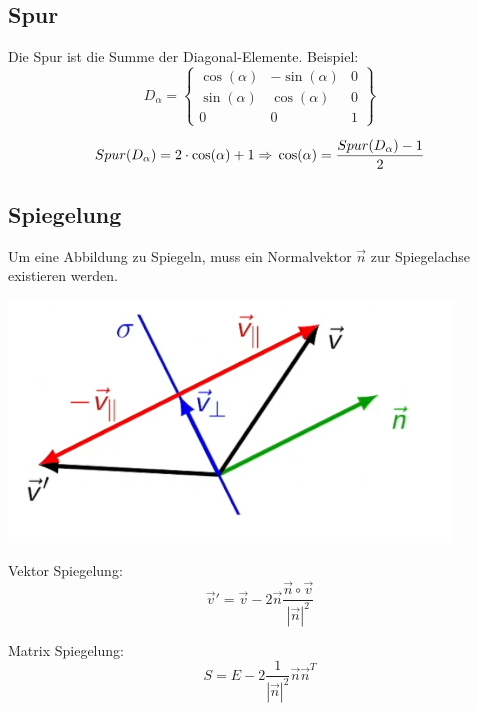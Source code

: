 \subsection{Spur}\label{drehwinkel}
Die Spur ist die Summe der Diagonal-Elemente.
Beispiel:
\[
	D_\alpha = \begin{Bmatrix}
		\cos(\alpha) & -\sin(\alpha) & 0 \\
		\sin(\alpha) & \cos(\alpha) & 0 \\
		0 & 0 & 1
	\end{Bmatrix}
\]

\[
    Spur(D_\alpha) = 2 \cdot \cos(\alpha) + 1 \\
	\Rightarrow \\
	\cos(\alpha) = \frac{Spur(D_\alpha) - 1}{2}
\]

\subsection{Spiegelung}
Um eine Abbildung zu Spiegeln, muss ein Normalvektor $\vec{n}$ zur Spiegelachse existieren werden.

\begin{center}
	\begin{minipage}{0.25\textwidth}
		\includegraphics[width=\linewidth,keepaspectratio=true]{./Images/Spiegelung.png}
	\end{minipage}%
	\begin{minipage}{0.2\textwidth}
		Vektor Spiegelung:
		\[\vec{v}' = \vec{v} - 2\vec{n}\frac{\vec{n} \circ \vec{v}}{|\vec{n}|^2}\]

		Matrix Spiegelung:
		\[S = E - 2\frac{1}{|\vec{n}|^2}\vec{n}\vec{n}^T\]
	\end{minipage}
\end{center}


